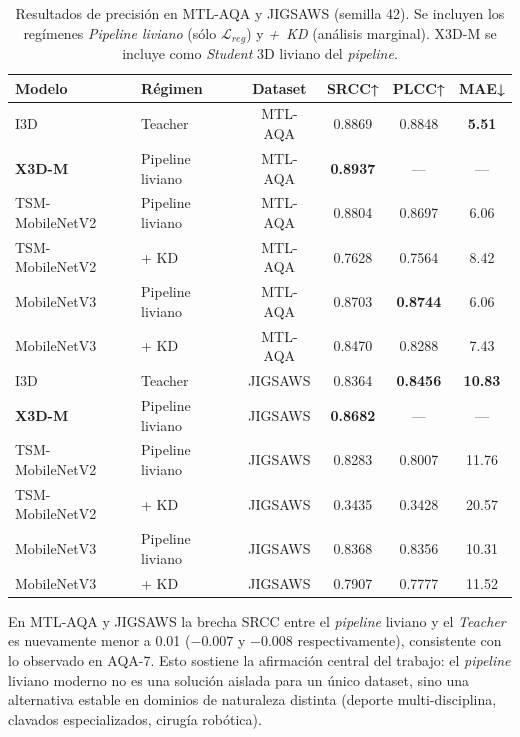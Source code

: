 \begin{table}[H]
\centering
\caption{Resultados de precisión en MTL-AQA y JIGSAWS (semilla 42). Se incluyen los regímenes \textit{Pipeline liviano} (sólo $\mathcal{L}_{reg}$) y \textit{+~KD} (análisis marginal). X3D-M se incluye como \textit{Student} 3D liviano del \textit{pipeline}.}
\label{tab:precision_otros}
\small
\begin{tabular}{llcccc}
\toprule
\textbf{Modelo} & \textbf{Régimen} & \textbf{Dataset} & \textbf{SRCC}↑ & \textbf{PLCC}↑ & \textbf{MAE}↓ \\
\midrule
I3D             & Teacher          & MTL-AQA & 0.8869          & 0.8848          & \textbf{5.51}  \\
\textbf{X3D-M}  & Pipeline liviano & MTL-AQA & \textbf{0.8937} & ---             & ---            \\
TSM-MobileNetV2 & Pipeline liviano & MTL-AQA & 0.8804          & 0.8697          & 6.06           \\
TSM-MobileNetV2 & + KD             & MTL-AQA & 0.7628          & 0.7564          & 8.42           \\
MobileNetV3     & Pipeline liviano & MTL-AQA & 0.8703          & \textbf{0.8744} & 6.06           \\
MobileNetV3     & + KD             & MTL-AQA & 0.8470          & 0.8288          & 7.43           \\
\midrule
I3D             & Teacher          & JIGSAWS & 0.8364          & \textbf{0.8456} & \textbf{10.83} \\
\textbf{X3D-M}  & Pipeline liviano & JIGSAWS & \textbf{0.8682} & ---             & ---            \\
TSM-MobileNetV2 & Pipeline liviano & JIGSAWS & 0.8283          & 0.8007          & 11.76          \\
TSM-MobileNetV2 & + KD             & JIGSAWS & 0.3435          & 0.3428          & 20.57          \\
MobileNetV3     & Pipeline liviano & JIGSAWS & 0.8368          & 0.8356          & 10.31          \\
MobileNetV3     & + KD             & JIGSAWS & 0.7907          & 0.7777          & 11.52          \\
\bottomrule
\end{tabular}
\end{table}

En MTL-AQA y JIGSAWS la brecha SRCC entre el \textit{pipeline} liviano y el \textit{Teacher} es nuevamente menor a 0.01 ($-0.007$ y $-0.008$ respectivamente), consistente con lo observado en AQA-7. Esto sostiene la afirmación central del trabajo: el \textit{pipeline} liviano moderno no es una solución aislada para un único dataset, sino una alternativa estable en dominios de naturaleza distinta (deporte multi-disciplina, clavados especializados, cirugía robótica).

